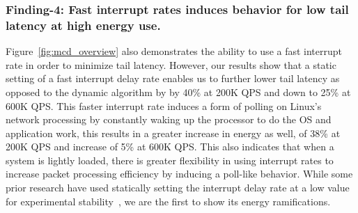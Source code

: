 \subsubsection{Finding-4: Fast interrupt rates induces behavior for low tail latency at high energy use.} \label{sec:f4} Figure~\ref{fig:mcd_overview} also demonstrates the ability to use a fast interrupt rate in order to minimize tail latency. However, our results show that a static setting of a fast interrupt delay rate enables us to further lower tail latency as opposed to the dynamic algorithm by by 40\% at 200K QPS and down to 25\% at 600K QPS. This faster interrupt rate induces a form of polling on Linux's network processing by constantly waking up the processor to do the OS and application work, this results in a greater increase in energy as well, of 38\% at 200K QPS and increase of 5\% at 600K QPS. This also indicates that when a system is lightly loaded, there is greater flexibility in using interrupt rates to increase packet processing efficiency by inducing a poll-like behavior. While some prior research have used statically setting the interrupt delay rate at a low value for experimental stability~\cite{arrakis, shenango}, we are the first to show its energy ramifications.





